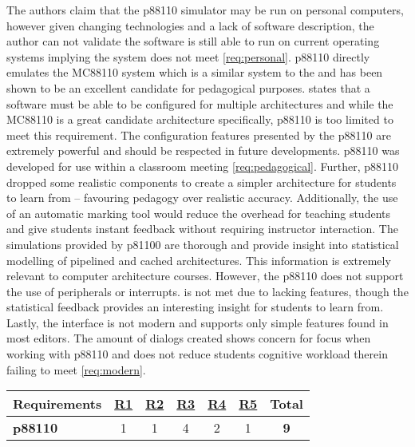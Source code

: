 The authors claim that the p88110 simulator may be run on personal computers, however given changing technologies and a lack of software description, the author can not validate the software is still able to run on current operating systems implying the system does not meet \cref{req:personal}. p88110 directly emulates the MC88110 system which is a similar system to the \hcmodel and has been shown to be an excellent candidate for pedagogical purposes.  states that a software must be able to be configured for multiple architectures and while the MC88110 is a great candidate architecture specifically, p88110 is too limited to meet this requirement. The configuration features presented by the p88110 are extremely powerful and should be respected in future developments. p88110 was developed for use within a classroom meeting \cref{req:pedagogical}. Further, p88110 dropped some realistic components to create a simpler architecture for students to learn from -- favouring pedagogy over realistic accuracy. Additionally, the use of an automatic marking tool would reduce the overhead for teaching students and give students instant feedback without requiring instructor interaction. The simulations provided by p81100 are thorough and provide insight into statistical modelling of pipelined and cached architectures. This information is extremely relevant to computer architecture courses. However, the p88110 does not support the use of peripherals or interrupts.  is not met due to lacking features, though the statistical feedback provides an interesting insight for students to learn from. Lastly, the interface is not modern and supports only simple features found in most editors. The amount of dialogs created shows concern for focus when working with p88110 and does not reduce students cognitive workload therein failing to meet \cref{req:modern}. 

\begin{table}[h!]
    \centering
    \begin{tabular}{lcccccc}
        \textbf{Requirements} & \textbf{\hyperref[req:personal]{R1}} & \textbf{\hyperref[req:configuration]{R2}} & \textbf{\hyperref[req:pedagogical]{R3}} & \textbf{\hyperref[req:simulations]{R4}} & \textbf{\hyperref[req:modern]{R5}} & \textbf{Total} \\ \hline
        \textbf{p88110}          & 1                                  & 1                                    & 4                            & 2                                  & 1                             & \textbf{9}     \\
    \end{tabular}
\end{table}

